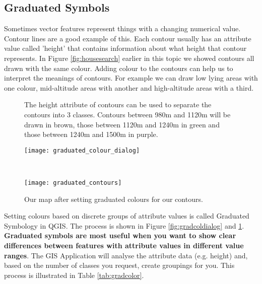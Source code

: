 \subsection{Graduated Symbols}

Sometimes vector features represent things with a changing numerical value.
Contour lines are a good example of this. Each contour usually has an
attribute value called 'height' that contains information about what height
that contour represents. In Figure \ref{fig:housesearch} earlier in this
topic we showed
contours all drawn with the same colour. Adding colour to the contours can
help us to interpret the meanings of contours. For example we can draw low
lying areas with one colour, mid-altitude areas with another and
high-altitude areas with a third.

\begin{figure}[htpb]
   \begin{minipage}[h]{\textwidth}
   \begin{center}
   \caption{The height attribute of contours can be used to separate the
contours into 3 classes. Contours between 980m and 1120m will be drawn in
brown, those between 1120m and 1240m in green and those between 1240m and
1500m in purple.}
   \label{fig:gradcoldialog}\smallskip
   \texttt{[image: graduated\_colour\_dialog]}
   \end{center}
   \end{minipage} \\
   \vspace{1cm}
   \begin{minipage}[h]{\textwidth}
   \begin{center}
   \caption{Our map after setting graduated colours for our contours.}
   \label{fig:gradcontours}\smallskip
   \texttt{[image: graduated\_contours]}
   \end{center}
   \end{minipage}
\end{figure}

Setting colours based on discrete groups of attribute values is called
Graduated Symbology in QGIS. The process is shown in Figure
\ref{fig:gradcoldialog} and \ref{fig:gradcontours}. \textbf{Graduated symbols
are most useful when you want to show clear
differences between features with attribute values in different value ranges}.
The GIS Application will analyse the attribute data (e.g. height) and, based
on the number of classes you request, create groupings for you. This process
is illustrated in Table \ref{tab:gradcolor}.

